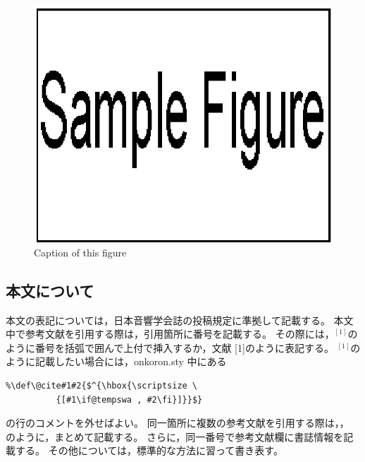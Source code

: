 \documentclass[10pt,twocolumn]{jarticle} %
\begin{document}
%
%
\begin{figure}[tb]
\begin{center}
\includegraphics[width=0.8\columnwidth]{sample.eps}
\vspace{-10pt}     %
\end{center}
\caption{Caption of this figure}
\label{fig:thatfigure}
\end{figure}
%

\subsection{本文について}

本文の表記については，日本音響学会誌の投稿規定に準拠して記載する。
本文中で参考文献を引用する際は，引用箇所に番号を記載する。
その際には，$^{[1]}$のように番号を括弧で囲んで上付で挿入するか，文献
[1]のように表記する。
$^{[1]}$のように記載したい場合には，onkoron.sty 中にある
\begin{verbatim}
%\def\@cite#1#2{$^{\hbox{\scriptsize \
          {[#1\if@tempswa , #2\fi}]}}$}
\end{verbatim}
の行のコメントを外せばよい。
同一箇所に複数の参考文献を引用する際は，\cite{article,sansho}，
\cite{article,book,taka}のように，まとめて記載する。
さらに，同一番号で参考文献欄に書誌情報を記載する。
その他については，標準的な方法に習って書き表す\cite{sansho}。

\end{document}
